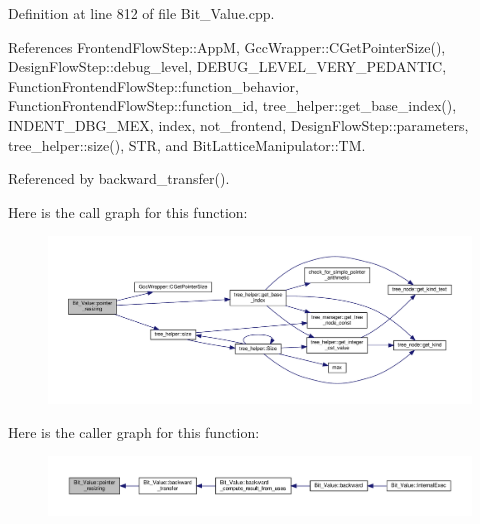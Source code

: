 Definition at line 812 of file Bit\+\_\+\+Value.\+cpp.



References Frontend\+Flow\+Step\+::\+AppM, Gcc\+Wrapper\+::\+C\+Get\+Pointer\+Size(), Design\+Flow\+Step\+::debug\+\_\+level, D\+E\+B\+U\+G\+\_\+\+L\+E\+V\+E\+L\+\_\+\+V\+E\+R\+Y\+\_\+\+P\+E\+D\+A\+N\+T\+IC, Function\+Frontend\+Flow\+Step\+::function\+\_\+behavior, Function\+Frontend\+Flow\+Step\+::function\+\_\+id, tree\+\_\+helper\+::get\+\_\+base\+\_\+index(), I\+N\+D\+E\+N\+T\+\_\+\+D\+B\+G\+\_\+\+M\+EX, index, not\+\_\+frontend, Design\+Flow\+Step\+::parameters, tree\+\_\+helper\+::size(), S\+TR, and Bit\+Lattice\+Manipulator\+::\+TM.



Referenced by backward\+\_\+transfer().

Here is the call graph for this function\+:
\nopagebreak
\begin{figure}[H]
\begin{center}
\leavevmode
\includegraphics[width=350pt]{df/d4b/classBit__Value_a91a36b568a7e9ddf21b7069ee4ecc518_cgraph}
\end{center}
\end{figure}
Here is the caller graph for this function\+:
\nopagebreak
\begin{figure}[H]
\begin{center}
\leavevmode
\includegraphics[width=350pt]{df/d4b/classBit__Value_a91a36b568a7e9ddf21b7069ee4ecc518_icgraph}
\end{center}
\end{figure}
\mbox{\label{classBit__Value_a680cd4a8faa401adb3262c2cfd8fc06f}} 
